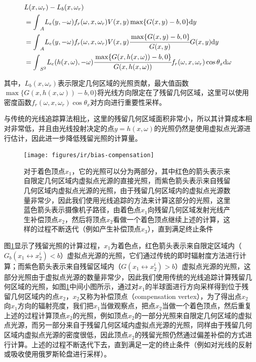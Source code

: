 \begin{equation}
\begin{aligned}
	&L(x,\omega_r)-L_b(x,\omega_r)\\
	&={\rm \int}_AL_e(y,-\omega)f_r(\omega,x,\omega_r)V(x,y)\max\{G(x,y)-b,0\}{\rm d}y\\
	&={\rm \int}_AL_e(y,-\omega)f_r(\omega,x,\omega_r)V(x,y) \cfrac{\max\{G(x,y)-b,0\}}{G(x,y)}G(x,y) {\rm d}y\\
	&={\rm \int}_{S^{2}}L_e(h(x,\omega),-\omega) \cfrac{\max\{G(x,h(x,\omega))-b,0\}}{G(x,h(x,\omega))}f_r(\omega,x,\omega_r)\cos\theta_x {\rm d}\omega
\end{aligned}
\end{equation}

\noindent 其中，$L_b(x,\omega_r)$表示限定几何区域的光照贡献，最大值函数$\max\{G(x,h(x,\omega))-b,0\}$将光线方向限定在了残留几何区域，这里可以使用密度函数$f_r(\omega,x,\omega_r)\cos\theta_x$对方向进行重要性采样。

与传统的光线追踪算法相比，这里的残留几何区域面积非常小，所以其计算成本相对非常低，并且由光线投射决定的点$y=h(x,\omega)$的光照仍然是使用虚拟点光源进行估计，因此进一步降低残留光照的计算量。

\begin{figure}
\begin{fullwidth}
	\texttt{[image: figures/ir/bias-compensation]}
	\caption{对于着色顶点$x_1$，它的光照可以分为两部分，其中红色的箭头表示来自限定几何区域内虚拟点光源的直接光照，而紫色箭头表示来自残留几何区域内虚拟点光源的光照，由于残留几何区域内的虚拟点光源数量非常少，因此我们使用光线追踪的方法来计算这部分的光照，这里蓝色箭头表示摄像机子路径，由着色点$x_1$向残留几何区域发射光线产生补偿顶点$x_2$，然后将顶点$x_2$看做一个着色顶点继续上述的计算，这样的过程不断迭代（例如产生补偿顶点$x_3$），直到满足终止条件}
	\label{f:ir-bias-compensation}
\end{fullwidth}
\end{figure}

图\ref{f:ir-bias-compensation}显示了残留光照的计算过程，$x_1$为着色点，红色箭头表示来自限定区域内（$G_b(x_1\leftrightarrow x^{i}_2)<b$）虚拟点光源的光照，它们通过传统的即时辐射度方法进行计算；而紫色箭头表示来自残留区域内（$G(x_1\leftrightarrow x^{i}_2)>b$）虚拟点光源的光照，这部分光照由于虚拟点光源的数量非常少，因此我们使用传统的光线追踪计算残留几何区域的光照，如图\ref{f:ir-bias-compensation}中间小图所示，通过对$x_1$的半球面进行方向采样得到位于残留几何区域内的点$x_2$，$x_2$又称为补偿顶点（compensation vertex），为了得出点$x_2$向$x_1$方向的辐射亮度，我们把$x_1$当做观察点，把点$x_2$当做一个着色顶点，然后重复上述的过程计算顶点$x_2$的光照，例如顶点$x_2$的一部分光照来自限定几何区域的虚拟点光源，而另一部分来自于残留几何区域内虚拟点光源的光照，同样由于残留几何区域内虚拟点光源的密度很低，因此顶点$x_2$的残留光照仍然通过偏差补偿的方式进行计算。上述的过程不断迭代下去，直到满足一定的终止条件（例如对光线的反射或吸收使用俄罗斯轮盘进行采样）。


